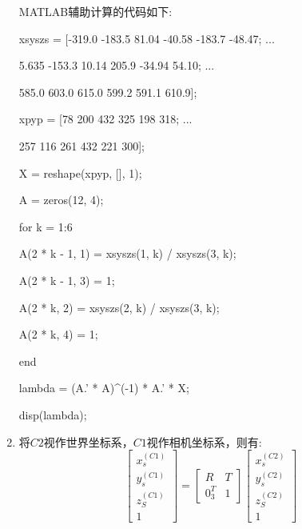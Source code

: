 \documentclass[]{article}
\newenvironment{Shaded}{}{}
\newcommand{\FloatTok}[1]{\textcolor[rgb]{0.25,0.63,0.44}{#1}}
\newcommand{\NormalTok}[1]{#1}
\begin{document}
\begin{enumerate}
MATLAB辅助计算的代码如下:

\begin{Shaded}
\begin{Highlighting}[]
\NormalTok{xsyszs = [-}\FloatTok{319.0}\NormalTok{ -}\FloatTok{183.5}   \FloatTok{81.04}\NormalTok{  -}\FloatTok{40.58}\NormalTok{ -}\FloatTok{183.7}\NormalTok{  -}\FloatTok{48.47}\NormalTok{; ...
}
   \FloatTok{5.635}\NormalTok{ -}\FloatTok{153.3}   \FloatTok{10.14}  \FloatTok{205.9}\NormalTok{  -}\FloatTok{34.94}   \FloatTok{54.10}\NormalTok{; ...
}
   \FloatTok{585.0}  \FloatTok{603.0}   \FloatTok{615.0}  \FloatTok{599.2}  \FloatTok{591.1}    \FloatTok{610.9}\NormalTok{];
}
\NormalTok{xpyp = [}\FloatTok{78}   \FloatTok{200}   \FloatTok{432}   \FloatTok{325}   \FloatTok{198}   \FloatTok{318}\NormalTok{; ...
}
\FloatTok{257}   \FloatTok{116}   \FloatTok{261}   \FloatTok{432}   \FloatTok{221}   \FloatTok{300}\NormalTok{];
}
\NormalTok{X = reshape(xpyp, [], }\FloatTok{1}\NormalTok{);
}
\NormalTok{A = zeros(}\FloatTok{12}\NormalTok{, }\FloatTok{4}\NormalTok{);
}
\NormalTok{for k = }\FloatTok{1}\NormalTok{:}\FloatTok{6}

\NormalTok{    A(}\FloatTok{2}\NormalTok{ * k - }\FloatTok{1}\NormalTok{, }\FloatTok{1}\NormalTok{) = xsyszs(}\FloatTok{1}\NormalTok{, k) / xsyszs(}\FloatTok{3}\NormalTok{, k);
}
\NormalTok{    A(}\FloatTok{2}\NormalTok{ * k - }\FloatTok{1}\NormalTok{, }\FloatTok{3}\NormalTok{) = }\FloatTok{1}\NormalTok{;
}
\NormalTok{    A(}\FloatTok{2}\NormalTok{ * k, }\FloatTok{2}\NormalTok{) = xsyszs(}\FloatTok{2}\NormalTok{, k) / xsyszs(}\FloatTok{3}\NormalTok{, k);
}
\NormalTok{    A(}\FloatTok{2}\NormalTok{ * k, }\FloatTok{4}\NormalTok{) = }\FloatTok{1}\NormalTok{;
}
\NormalTok{end
}
\NormalTok{lambda = (A.' * A)^(-}\FloatTok{1}\NormalTok{) * A.' * X;
}
\NormalTok{disp(lambda);}
\end{Highlighting}
\end{Shaded}

\item

将\(C2\)视作世界坐标系，\(C1\)视作相机坐标系，则有:
$$
\begin{bmatrix} x_s^{(C1)} \\ y_s^{(C1)} \\ z_S^{(C1)} \\ 1\end{bmatrix} = \begin{bmatrix}R & T \\ 0_3^T & 1 \end{bmatrix}\begin{bmatrix}x_s^{(C2)} \\ y_s^{(C2)} \\ z_S^{(C2)} \\ 1\end{bmatrix}
$$


\end{enumerate}
\end{document}
